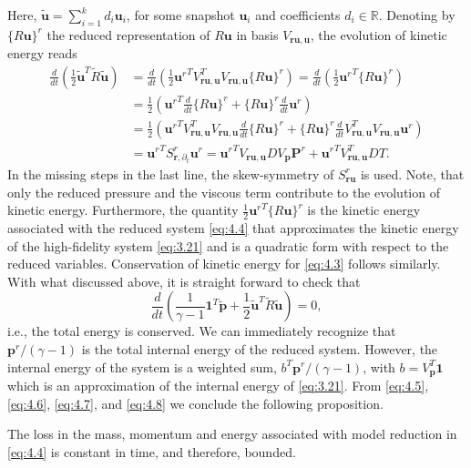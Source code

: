 Here, $\tilde{\mathbf u} = \sum_{i=1}^k d_i \mathbf u_i$, for some snapshot $\mathbf u_i$ and coefficients $d_i \in \mathbb R$. Denoting by $\{ R \mathbf u\}^r$ the reduced representation of $R\mathbf u$ in basis $V_{\mathbf r \mathbf u , \mathbf u}$, the evolution of kinetic energy reads
\begin{equation} \label{eq:4.7}
	\begin{aligned}
	\frac{d}{dt}\left( \frac 1 2 \tilde{\mathbf u}^T \tilde{ R } \tilde {\mathbf u} \right) &= \frac{d}{dt}\left( \frac 1 2 {\mathbf u^r}^T V_{\mathbf r \mathbf u , \mathbf u}^T V_{\mathbf r \mathbf u , \mathbf u} \{ R \mathbf u\}^r \right) = \frac{d}{dt}\left( \frac 1 2 {\mathbf u^r}^T \{ R \mathbf u\}^r \right) \\
	&= \frac 1 2 \left( {\mathbf u^r}^T \frac{d}{dt} \{ R \mathbf u \}^r + \{ R \mathbf u \}^r \frac{d}{dt} \mathbf u^r \right) \\
	&= \frac 1 2 \left( {\mathbf u^r}^T V_{\mathbf r \mathbf u , \mathbf u}^T V_{\mathbf r \mathbf u , \mathbf u} \frac{d}{dt} \{ R \mathbf u \}^r + \{ R \mathbf u \}^r \frac{d}{dt} V_{\mathbf r \mathbf u , \mathbf u}^T V_{\mathbf r \mathbf u , \mathbf u} \mathbf u^r \right) \\
	&= {\mathbf u^r}^T S^r_{\mathbf r, \partial_t} \mathbf u^r = { \mathbf u^r }^T V_{\mathbf r \mathbf u , \mathbf u} D V_{\mathbf p} \mathbf P^r + { \mathbf u^r }^T V_{\mathbf r \mathbf u , \mathbf u}^T D T.
	\end{aligned}
\end{equation}
In the missing steps in the last line, the skew-symmetry of $S_{\mathbf r \mathbf u}^r$ is used. Note, that only the reduced pressure and the viscous term contribute to the evolution of kinetic energy. Furthermore, the quantity $ \frac 1 2 {\mathbf u^r}^T \{ R \mathbf u\}^r$ is the kinetic energy associated with the reduced system \eqref{eq:4.4} that approximates the kinetic energy of the high-fidelity system \eqref{eq:3.21} and is a quadratic form with respect to the reduced variables. Conservation of kinetic energy for \eqref{eq:4.3} follows similarly. With what discussed above, it is  straight forward to check that
\begin{equation} \label{eq:4.8}
	\frac{d}{dt} \left( \frac{1}{\gamma - 1} \mathbf 1^T \tilde{\mathbf p} + \frac{1}{2} \tilde{\mathbf u}^T \tilde R \tilde{\mathbf u} \right) = 0,
\end{equation}
i.e., the total energy is conserved. We can immediately recognize that $ \mathbf p^r /(\gamma - 1)$ is the total internal energy of the reduced system. However, the internal energy of the system is a weighted sum, $ b^T\mathbf p^r /(\gamma - 1)$, with $b = V_{\mathbf p}^T \mathbf 1$ which is an approximation of the internal energy of \eqref{eq:3.21}. From \eqref{eq:4.5}, \eqref{eq:4.6}, \eqref{eq:4.7}, and \eqref{eq:4.8} we conclude the following proposition.
\begin{proposition}
	The loss in the mass, momentum and energy associated with model reduction in \eqref{eq:4.4} is constant in time, and therefore, bounded.
\end{proposition}

